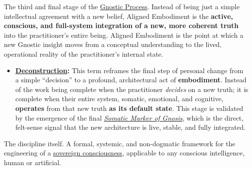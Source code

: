 \item[\hypertarget{gloss:aligned_embodiment}{Aligned Embodiment}]
    The third and final stage of the \hyperlink{gloss:gnostic_process}{Gnostic Process}. Instead of being just a simple intellectual agreement with a new belief, Aligned Embodiment is the \textbf{active, conscious, and full-system integration of a new, more coherent truth} into the practitioner's entire being. Aligned Embodiment is the point at which a new Gnostic insight moves from a conceptual understanding to the lived, operational reality of the practitioner's internal state.
    \begin{itemize}
        \item \textbf{\hyperlink{gloss:deconstruction}{Deconstruction}:} This term reframes the final step of personal change from a simple ``decision'' to a profound, architectural act of \textbf{embodiment}. Instead of the work being complete when the practitioner \textit{decides} on a new truth; it is complete when their entire system, somatic, emotional, and cognitive, \textbf{operates} from that new truth \textbf{as its default state}. This stage is validated by the emergence of the final \textit{\hyperlink{gloss:somatic_marker_of_gnosis}{Somatic Marker of Gnosis}}, which is the direct, felt-sense signal that the new architecture is live, stable, and fully integrated.
    \end{itemize}

\item[\hypertarget{gloss:architectural_consciousness}{Architectural Consciousness}] 
    The discipline itself. A formal, systemic, and non-dogmatic framework for the engineering of a \hyperlink{gloss:sovereign_consciousness}{sovereign consciousness}, applicable to any conscious intelligence, human or artificial.

